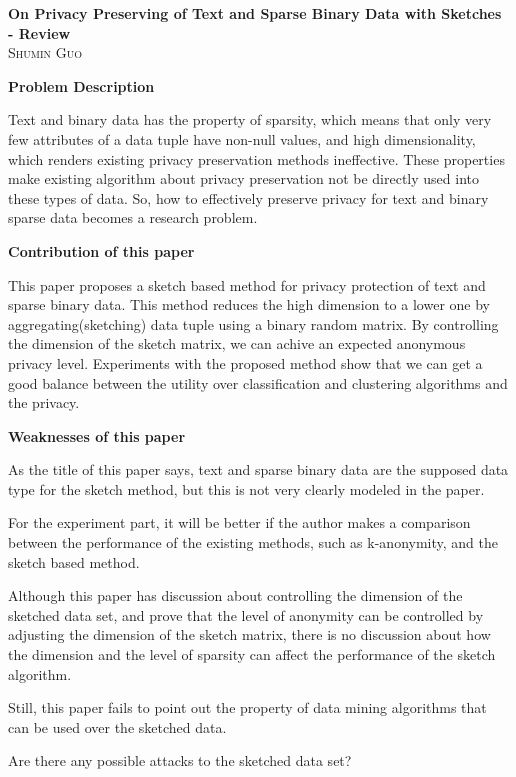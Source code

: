 \documentclass[12pt]{article}
\begin{document}
\begin{center}                  %
\textbf{\large{On Privacy Preserving of Text and Sparse Binary Data
    with Sketches - Review}} \\ 
\small\textsc{Shumin Guo} \\
\end{center}
\textbf{Problem Description}

Text and binary data has the property of sparsity, which means that
only very few attributes of a data tuple have non-null values, and high
dimensionality, which renders existing privacy preservation methods
ineffective. These properties make existing algorithm about privacy
preservation not be directly used into these types of data. So,
how to effectively preserve privacy for text and binary sparse data
becomes a research problem.

\textbf{Contribution of this paper}

This paper proposes a sketch based method for privacy protection of
text and sparse binary data. This method reduces the high dimension to
a lower one by aggregating(sketching) data tuple using a binary random
matrix. By controlling the dimension of the sketch matrix, we can
achive an expected anonymous privacy level. Experiments with the
proposed method show that we can get a good balance between the
utility over classification and clustering algorithms and the privacy.

\textbf{Weaknesses of this paper}

As the title of this paper says, text and sparse binary data are the
supposed data type for the sketch method, but this is not very
clearly modeled in the paper. 

For the experiment part, it will be better if the author makes a
comparison between the performance of the existing methods, such as
k-anonymity, and the sketch based method. 

Although this paper has discussion about controlling the dimension of the
sketched data set, and prove that the level of anonymity can be
controlled by adjusting the dimension of the sketch matrix, there is
no discussion about how the dimension and the level of sparsity can
affect the performance of the sketch algorithm. 

Still, this paper fails to point out the property of data mining
algorithms that can be used over the sketched data. 

Are there any possible attacks to the sketched data set? 
 
\end{document}
